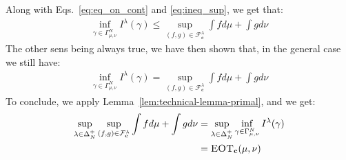 \begin{prv*}
Along with Eqs.~\ref{eq:eq_on_cont} and \ref{eq:ineq_sup}, we get that:
\begin{align*}
\inf_{\gamma\in \Gamma^N_{\mu,\nu}}I^\lambda(\gamma)\leq\sup\limits_{(f,g)\in\mathcal{F}^\lambda_\mathbf{c}}\int fd\mu+\int gd\nu
\end{align*}
The other sens being always true, we have then  shown that, in the general case we still have:
\begin{align*}
    \inf_{\gamma\in \Gamma^N_{\mu,\nu}}I^\lambda(\gamma)=\sup\limits_{(f,g)\in\mathcal{F}^\lambda_\mathbf{c}}\int fd\mu+\int gd\nu
\end{align*}
To conclude, we apply Lemma~\ref{lem:technical-lemma-primal}, and we get: 
\begin{align*}
\sup_{\lambda\in\Delta^+_N} \sup\limits_{(f,g)\in\mathcal{F}^\lambda_\mathbf{c}}\int fd\mu+\int gd\nu &=\sup_{\lambda\in\Delta^+_N} \inf_{\gamma\in \Gamma^N_{\mu,\nu}}I^\lambda(\gamma)\\
&= \textsc{EOT}_\mathbf{c}(\mu,\nu)\\
\end{align*}


\end{prv*}




